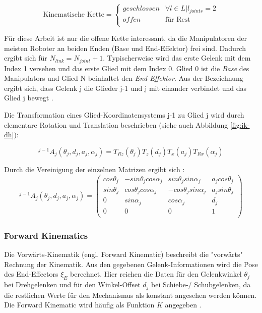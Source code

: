 \begin{equation}
	 \text{Kinematische Kette} = 
	\begin{cases}
		geschlossen & \forall l \in L | l_{joints} = 2 \\
		offen & \text{für Rest} \\
	\end{cases}
\end{equation}

Für diese Arbeit ist nur die offene Kette interessant, da die Manipulatoren der meisten Roboter an beiden Enden (Base und End-Effektor) frei sind. Dadurch ergibt sich für $N_{link} = N_{joint} + 1$. Typischerweise wird das erste Gelenk mit dem Index 1 versehen und das erste Glied mit dem Index 0. Glied 0 ist die \textit{Base} des Manipulators und Glied N beinhaltet den\textit{ End-Effektor}. Aus der Bezeichnung ergibt sich, dass Gelenk j die Glieder j-1 und j mit einander verbindet und das Glied j bewegt \citep{Corke2011}. 

Die Transformation eines Glied-Koordinatensystems {j-1} zu Glied {j} wird durch elementare Rotation und Translation beschrieben (siehe auch Abbildung \ref{fig:ik-dh}):

\begin{equation}
^{j-1}A_{j}(\theta_j,d_j,a_j,\alpha_j) = T_{Rz}(\theta_j)T_{z}(d_j)T_{x}(a_j)T_{Rx}(\alpha_j)
\label{f:basics-ik-k}
\end{equation}


Durch die Vereinigung der einzelnen Matrizen ergibt sich \cite{Corke2011}:
\begin{equation}
^{j-1}A_{j}(\theta_j,d_j,a_j,\alpha_j) = 
\begin{pmatrix}
cos \theta_j & -sin \theta_j cos \alpha_j & sin \theta_j sin \alpha_j  & a_j cos \theta_j\\
sin \theta_j & cos \theta_j cos \alpha_j & -cos \theta_j sin \alpha_j  & a_j sin\theta_j\\
0 			&sin \alpha_j 				& cos \alpha_j  & d_j\\
0 & 0 & 0& 1\\
\end{pmatrix}
\end{equation}

\subsubsection{Forward Kinematics}

Die Vorwärts-Kinematik (engl. Forward Kinematic) beschreibt die "vorwärts"  Rechnung der Kinematik. Aus den gegebenen Gelenk-Informationen wird die Pose des End-Effectors $\xi_E$ berechnet. Hier reichen die Daten für den Gelenkwinkel $\theta_j$ bei Drehgelenken und für den Winkel-Offset $d_j$ bei Schiebe-/ Schubgelenken, da die restlichen Werte für den Mechanismus als konstant angesehen werden können. Die Forward Kinematic wird häufig als Funktion $K$ angegeben \citep{Corke2011}.

